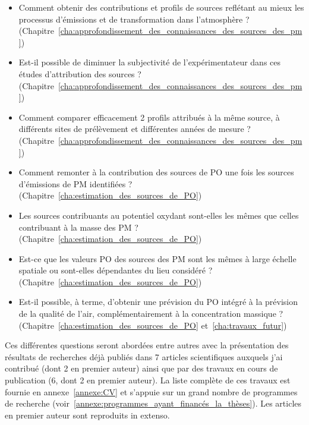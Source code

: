 \begin{itemize}
    \item Comment obtenir des contributions et profils de sources reflétant au mieux les
        processus d'émissions et de transformation dans l'atmosphère ?
        (Chapitre~\ref{cha:approfondissement_des_connaissances_des_sources_des_pm})
    \item Est-il possible de diminuer la subjectivité de l'expérimentateur dans ces
        études d'attribution des sources ?
        (Chapitre~\ref{cha:approfondissement_des_connaissances_des_sources_des_pm})
    \item Comment comparer efficacement 2 profils attribués à la même source, à
        différents sites de prélèvement et différentes années de mesure ?
        (Chapitre~\ref{cha:approfondissement_des_connaissances_des_sources_des_pm})
    \item Comment remonter à la contribution des sources de PO une fois les sources
        d'émissions de PM identifiées ?
        (Chapitre~\ref{cha:estimation_des_sources_de_PO})
    \item Les sources contribuants au potentiel oxydant sont-elles les mêmes que celles
        contribuant à la masse des PM ?
        (Chapitre~\ref{cha:estimation_des_sources_de_PO})
    \item Est-ce que les valeurs PO des sources des PM sont les mêmes à large échelle spatiale ou
        sont-elles dépendantes du lieu considéré ?
        (Chapitre~\ref{cha:estimation_des_sources_de_PO})
    \item Est-il possible, à terme, d'obtenir une prévision du PO intégré à la prévision
        de la qualité de l'air, complémentairement à la concentration massique ?
        (Chapitre~\ref{cha:estimation_des_sources_de_PO} et~\ref{cha:travaux_futur})
\end{itemize}

Ces différentes questions seront abordées entre autres avec la présentation des résultats de
recherches déjà publiés dans 7 articles scientifiques auxquels j'ai contribué (dont 2 
en premier auteur) ainsi que par des travaux en cours de publication (6, dont 2 en premier auteur).
La liste complète de ces travaux est fournie en annexe~\ref{annexe:CV} et s'appuie sur un
grand nombre de programmes de recherche
(voir~\ref{annexe:programmes_ayant_financés_la_thèses}). Les articles en
premier auteur sont reproduits in extenso.
